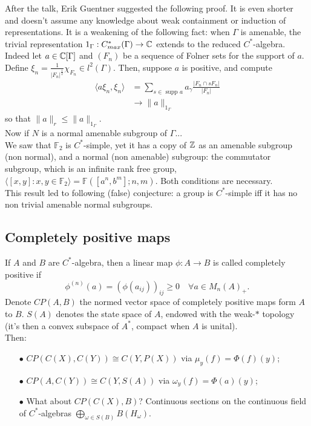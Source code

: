 After the talk, Erik Guentner suggested the following proof. It is even shorter and doesn't assume any knowledge about weak containment or induction of representations. It is a weakening of the following fact: when $\Gamma$ is amenable, the trivial representation $1_\Gamma : C^*_{max}(\Gamma)\rightarrow \mathbb C$ extends to the reduced $C^*$-algebra.\\

Indeed let $a\in \mathbb C [\Gamma]$ and $(F_n)$ be a sequence of Folner sets for the support of $a$. Define $\xi_n = \frac{1}{|F_n|^\frac{1}{2}} \chi_{F_n} \in l^2(\Gamma )$. Then, suppose $a$ is positive, and compute
\[\begin{split}
\langle a \xi_n , \xi_n \rangle & = \sum_{s\in \text{ supp }a} a_\gamma \frac{|F_n \cap sF_n|}{|F_n|} \\ 
				& \rightarrow \| a \|_{1_\Gamma}
\end{split}\]
so that $ \| a\|_r \leq \| a\|_{1_\Gamma} $.\\

Now if $N$ is a normal amenable subgroup of $\Gamma$...\\

We saw that $\mathbb F_2$ is $C^*$-simple, yet it has a copy of $\mathbb Z$ as an amenable subgroup (non normal), and a normal (non amenable) subgroup: the commutator subgroup, which is an infinite rank free group, $\langle [x,y ] : x,y \in \mathbb F_2\rangle = \mathbb F([a^n, b^m] ; n,m) $. Both conditions are necessary.\\

This result led to following (false) conjecture: a group is $C^*$-simple iff it has no non trivial amenable normal subgroups.\\

\subsection{Completely positive maps}

If $A$ and $B$ are $C^*$-algebra, then a linear map $\phi : A\rightarrow B$ is called completely positive if 
\[\phi^{(n)}(a) = (\phi(a_{ij}))_{ij} \geq 0 \quad \forall a \in M_n(A)_+.\]
Denote $CP(A,B)$ the normed vector space of completely positive maps form $A$ to $B$. $S(A)$ denotes the state space of $A$, endowed with the weak-$*$ topology (it's then a convex subspace of $A^*$, compact when $A$ is unital).\\

Then: \\
\begin{itemize}
\item[$\bullet$] $CP(C(X),C(Y)) \cong C(Y, P(X))$ via $\mu_y(f) = \Phi(f)(y)$; \\

\item[$\bullet$] $CP(A,C(Y)) \cong C(Y, S(A))$ via $\omega_y(f) = \Phi(a)(y)$;\\

\item[$\bullet$] What about $CP(C(X),B)$? Continuous sections on the continuous field of $C^*$-algebras $\bigoplus_{\omega\in S(B)} B(H_\omega)$.\\
\end{itemize}
 
